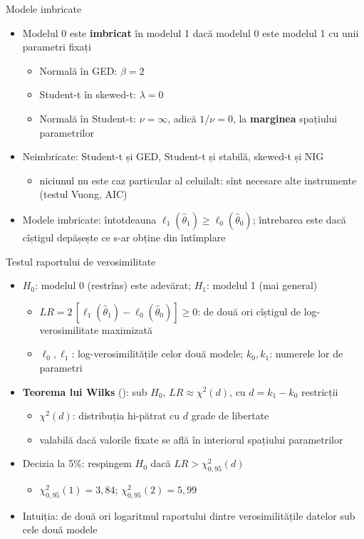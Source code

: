 \begin{frame}{Modele imbricate}
\itemsize{\small}
\begin{itemize}
    \item Modelul 0 este \textbf{imbricat} în modelul 1 dacă modelul 0 este modelul 1 cu unii parametri fixați
    \begin{itemize}
        \item Normală în GED: $\beta = 2$
        \item Student-t în skewed-t: $\lambda = 0$
        \item Normală în Student-t: $\nu = \infty$, adică $1/\nu = 0$, la \textbf{marginea} spațiului parametrilor
    \end{itemize}
    \item Neimbricate: Student-t și GED, Student-t și stabilă, skewed-t și NIG
    \begin{itemize}
        \item niciunul nu este caz particular al celuilalt: sînt necesare alte instrumente (testul Vuong, AIC)
    \end{itemize}
    \item Modele imbricate: întotdeauna $\ell_1(\hat\theta_1) \ge \ell_0(\hat\theta_0)$; întrebarea este dacă cîștigul depășește ce s-ar obține din întîmplare
\end{itemize}
\end{frame}

\begin{frame}{Testul raportului de verosimilitate}
\itemsize{\small}
\begin{itemize}
    \item $H_0$: modelul 0 (restrîns) este adevărat; $H_1$: modelul 1 (mai general)
    \begin{itemize}
        \item $LR = 2\,[\ell_1(\hat\theta_1) - \ell_0(\hat\theta_0)] \ge 0$: de două ori cîștigul de log-verosimilitate maximizată
        \item $\ell_0, \ell_1$: log-verosimilitățile celor două modele; $k_0, k_1$: numerele lor de parametri
    \end{itemize}
    \item \textbf{Teorema lui Wilks} (): sub $H_0$, $LR \approx \chi^2(d)$, cu $d = k_1 - k_0$ restricții
    \begin{itemize}
        \item $\chi^2(d)$: distribuția hi-pătrat cu $d$ grade de libertate
        \item valabilă dacă valorile fixate se află în interiorul spațiului parametrilor
    \end{itemize}
    \item Decizia la 5\%: respingem $H_0$ dacă $LR > \chi^2_{0{,}95}(d)$
    \begin{itemize}
        \item $\chi^2_{0{,}95}(1) = 3{,}84$; $\chi^2_{0{,}95}(2) = 5{,}99$
    \end{itemize}
    \item Intuiția: de două ori logaritmul raportului dintre verosimilitățile datelor sub cele două modele
\end{itemize}
\end{frame}

